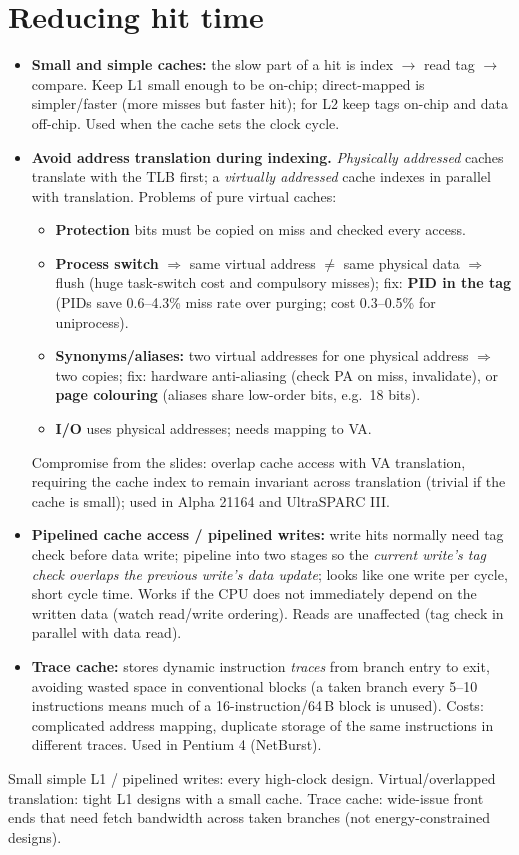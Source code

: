 \section{Reducing hit time}
\begin{itemize}
\item \textbf{Small and simple caches:} the slow part of a hit is index $\rightarrow$ read tag $\rightarrow$ compare. Keep L1 small enough to be on-chip; direct-mapped is simpler/faster (more misses but faster hit); for L2 keep tags on-chip and data off-chip. Used when the cache sets the clock cycle.
\item \textbf{Avoid address translation during indexing.} \emph{Physically addressed} caches translate with the TLB first; a \emph{virtually addressed} cache indexes in parallel with translation. Problems of pure virtual caches:
 \begin{itemize}
 \item \textbf{Protection} bits must be copied on miss and checked every access.
 \item \textbf{Process switch} $\Rightarrow$ same virtual address $\neq$ same physical data $\Rightarrow$ flush (huge task-switch cost and compulsory misses); fix: \textbf{PID in the tag} (PIDs save 0.6--4.3\% miss rate over purging; cost 0.3--0.5\% for uniprocess).
 \item \textbf{Synonyms/aliases:} two virtual addresses for one physical address $\Rightarrow$ two copies; fix: hardware anti-aliasing (check PA on miss, invalidate), or \textbf{page colouring} (aliases share low-order bits, e.g.\ 18 bits).
 \item \textbf{I/O} uses physical addresses; needs mapping to VA.
 \end{itemize}
 Compromise from the slides: overlap cache access with VA translation, requiring the cache index to remain invariant across translation (trivial if the cache is small); used in Alpha 21164 and UltraSPARC III.
\item \textbf{Pipelined cache access / pipelined writes:} write hits normally need tag check before data write; pipeline into two stages so the \emph{current write's tag check overlaps the previous write's data update}; looks like one write per cycle, short cycle time. Works if the CPU does not immediately depend on the written data (watch read/write ordering). Reads are unaffected (tag check in parallel with data read).
\item \textbf{Trace cache:} stores dynamic instruction \emph{traces} from branch entry to exit, avoiding wasted space in conventional blocks (a taken branch every 5--10 instructions means much of a 16-instruction/64\,B block is unused). Costs: complicated address mapping, duplicate storage of the same instructions in different traces. Used in Pentium 4 (NetBurst).
\end{itemize}
\begin{pick}
Small simple L1 / pipelined writes: every high-clock design. Virtual/overlapped translation: tight L1 designs with a small cache. Trace cache: wide-issue front ends that need fetch bandwidth across taken branches (not energy-constrained designs).
\end{pick}

